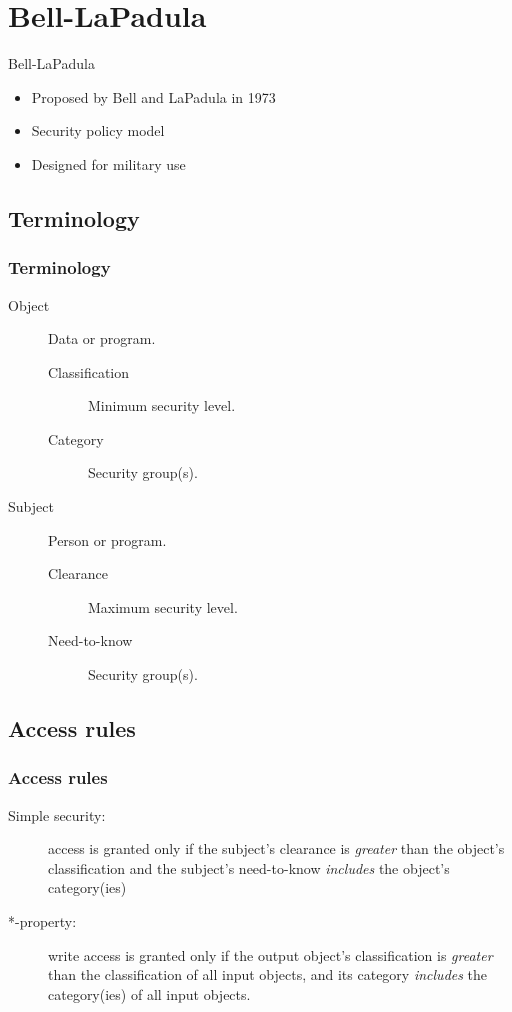 \documentclass[10pt]{beamer}
\begin{document}

\section{Bell-LaPadula}

\begin{frame}{Bell-LaPadula}{}
	\begin{itemize}
		\item Proposed by Bell and LaPadula in 1973
		\item Security policy model
		\item Designed for military use
	\end{itemize}
\end{frame}

\subsection{Terminology}
\begin{frame}
	\frametitle{Terminology}
	
	\begin{description}
		\item[Object] Data or program.
			\begin{description}
				\item[Classification] Minimum security level.
				\item[Category] Security group(s).
			\end{description}
		\item[Subject] Person or program.
			\begin{description}
				\item[Clearance] Maximum security level.
				\item[Need-to-know] Security group(s).
			\end{description}
	\end{description}
\end{frame}

\subsection{Access rules}
\begin{frame}
	\frametitle{Access rules}
	
	\begin{description}
		\item[Simple security:] access is granted only if the subject's clearance is \textit{greater} than the object's classification and the subject's need-to-know \textit{includes} the object's category(ies)
		\item[*-property:] write access is granted only if the output object's classification is \textit{greater} than the classification of all input objects, and its category \textit{includes} the category(ies) of all input objects.
	\end{description}
\end{frame}
\end{document}
